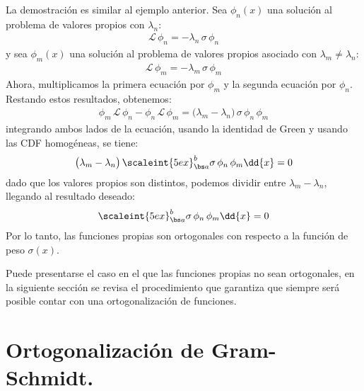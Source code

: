 La demostración es similar al ejemplo anterior. Sea $\phi_{n}(x)$ una solución al problema de valores propios con $\lambda_{n}$:
\begin{align*}
\mathcal{L} \, \phi_{n} = - \lambda_{n} \, \sigma \, \phi_{n}
\end{align*}
y sea $\phi_{m}(x)$ una solución al problema de valores propios asociado con \hfill \break $\lambda_{m} \neq \lambda_{n}$:
\begin{align*}
\mathcal{L} \, \phi_{m} = - \lambda_{m} \, \sigma \, \phi_{m}
\end{align*}
Ahora, multiplicamos la primera ecuación por $\phi_{m}$ y la segunda ecuación por $\phi_{n}$. Restando estos resultados, obtenemos:
\begin{align*}
\phi_{m}\, \mathcal{L} \, \phi_{n} - \phi_{n} \, \mathcal{L} \, \phi_{m} = \big( \lambda_{m} - \lambda_{n} \big) \, \sigma \, \phi_{n} \, \phi_{m}
\end{align*}
integrando ambos lados de la ecuación, usando la identidad de Green y usando las CDF homogéneas, se tiene:
\begin{align*}
\big( \lambda_{m} - \lambda_{n} \big) \, \scaleint{5ex}_{\bs a}^{b} \sigma \, \phi_{n} \, \phi_{m} \dd{x} = 0
\end{align*}
dado que los valores propios son distintos, podemos dividir entre $\lambda_{m} - \lambda_{n}$, llegando al resultado deseado:
\begin{align*}
\scaleint{5ex}_{\bs a}^{b} \sigma \, \phi_{n} \, \phi_{m} \dd{x} = 0
\end{align*}
Por lo tanto, las funciones propias son ortogonales con respecto a la función de peso $\sigma(x)$.
\par
Puede presentarse el caso en el que las funciones propias no sean ortogonales, en la siguiente sección se revisa el procedimiento que garantiza que siempre será posible contar con una ortogonalización de funciones.

\section{Ortogonalización de Gram-Schmidt.}


